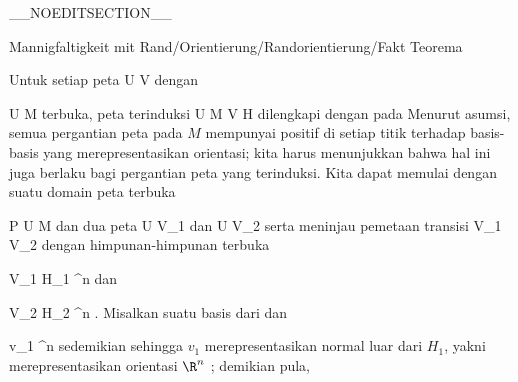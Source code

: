 __NOEDITSECTION__

{Mannigfaltigkeit mit Rand/Orientierung/Randorientierung/Fakt}
{Teorema}
{}
{

\faktzusatz {}
\faktzusatz {}

}
{

Untuk setiap peta
 {} {}
\maabbdisp {\alpha} { U } { V
} {}
dengan

\mavergleichskette
{\vergleichskette
{ U
}
{ \subseteq }{ M
}
{  }{
}
{    }{
}
{   }{
}
}
{}{}{}
terbuka, peta terinduksi
\maabbdisp {} {U \cap \partial M } { V \cap \partial H
} {}
dilengkapi dengan
pada
 Menurut asumsi, semua pergantian peta pada $M$ mempunyai
positif di setiap titik terhadap basis-basis yang merepresentasikan orientasi; kita harus menunjukkan bahwa hal ini juga berlaku bagi pergantian peta yang terinduksi. Kita dapat memulai dengan suatu domain peta terbuka

\mavergleichskette
{\vergleichskette
{ P
}
{ \in }{ U
}
{ \subseteq }{ M
}
{    }{
}
{   }{
}
}
{}{}{}
dan dua peta
 { U } { V_1
} {}
dan
 { U } { V_2
} {}
serta meninjau pemetaan transisi
 { V_1 } { V_2
} {}
dengan himpunan-himpunan terbuka

\mavergleichskette
{\vergleichskette
{ V_1
}
{ \subseteq }{ H_1
}
{ \subset }{ \R^n
}
{    }{
}
{   }{
}
}
{}{}{}
dan

\mavergleichskette
{\vergleichskette
{ V_2
}
{ \subseteq }{ H_2
}
{ \subset }{ \R^n
}
{    }{
}
{   }{
}
}
{}{}{.}
Misalkan
 suatu basis dari
 dan

\mavergleichskette
{\vergleichskette
{ v_1
}
{ \in }{ \R^n
}
{  }{
}
{    }{
}
{   }{
}
}
{}{}{}
sedemikian sehingga $v_1$ merepresentasikan normal luar dari $H_1$, yakni
 merepresentasikan orientasi $\R^n$
 {} {;}
demikian pula,

}
